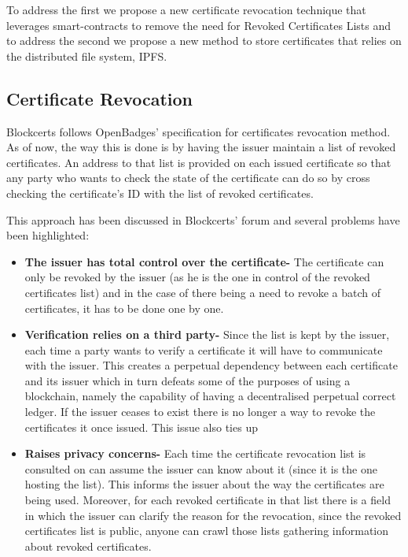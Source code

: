 \documentclass[llncsdoc]{llncs}
\begin{document}
To address the first we propose a new certificate revocation technique that leverages smart-contracts to remove the need for Revoked Certificates Lists and to address the second we propose a new method to store certificates that relies on the distributed file system, IPFS.


\subsection{Certificate Revocation}
\label{cert_revocation}
Blockcerts follows OpenBadges' specification for certificates revocation method. As of now, the way this is done is by having the issuer maintain a list of revoked certificates. An address to that list is provided on each issued certificate so that any party who wants to check the state of the certificate can do so by cross checking the certificate's ID with the list of revoked certificates.

This approach has been discussed in Blockcerts' forum and several problems have been highlighted:
\begin{itemize}
    \item \textbf{The issuer has total control over the certificate-} The certificate can only be revoked by the issuer (as he is the one in control of the revoked certificates list) and in the case of there being a need to revoke a batch of certificates, it has to be done one by one.
    \item \textbf{Verification relies on a third party-} Since the list is kept by the issuer, each time a party wants to verify a certificate it will have to communicate with the issuer. This creates a perpetual dependency between each certificate and its issuer which in turn defeats some of the purposes of using a blockchain, namely the capability of having a decentralised perpetual correct ledger. If the issuer ceases to exist there is no longer a way to revoke the certificates it once issued. This issue also ties up
    \item \textbf{Raises privacy concerns-} Each time the certificate revocation list is consulted on can assume the issuer can know about it (since it is the one hosting the list). This informs the issuer about the way the certificates are being used. Moreover, for each revoked certificate in that list there is a field in which the issuer can clarify the reason for the revocation, since the revoked certificates list is public, anyone can crawl those lists gathering information about revoked certificates.
  
\end{itemize}
\end{document}
